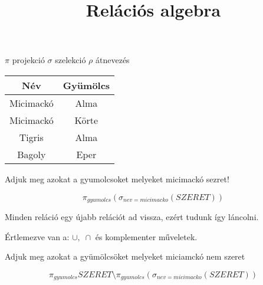 \documentclass[12pt,a4paper]{article}
\title{Relációs algebra}
\begin{document}
	\maketitle	
	
	$ \pi $ projekció
	$ \sigma $ szelekció
	$ \rho $ átnevezés
	
	\begin{tabular}{|c|c|}
		\hline
		Név & Gyümölcs \\
		\hline
		Micimackó & Alma \\
		\hline
		Micimackó & Körte \\
		\hline
		Tigris & Alma \\
		\hline
		Bagoly & Eper \\
		\hline
	\end{tabular}

	Adjuk meg azokat a gyumolcsoket melyeket micimackó sezret!
	
	\[
		\pi_{gyumolcs}{\left(  \sigma_{nev = micimacko}{\left( SZERET  \right) }\right) }
	\]
	
	Minden reláció egy újabb relációt ad vissza, ezért tudunk így láncolni.
	
	Értlemezve van a: $  \cup, \; \cap $ és komplementer műveletek.
	
	Adjuk meg azokat a gyümölcsöket melyeket miciamckó nem szeret
	
	\[
		\pi_{gyumolcs}{SZERET} \setminus \pi_{gyumolcs}{\left(  \sigma_{nev = micimacko}{\left( SZERET  \right) }\right) }
	\]
\end{document}
